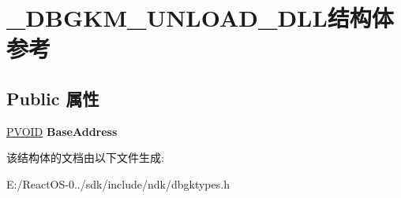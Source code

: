 \hypertarget{struct___d_b_g_k_m___u_n_l_o_a_d___d_l_l}{}\section{\+\_\+\+D\+B\+G\+K\+M\+\_\+\+U\+N\+L\+O\+A\+D\+\_\+\+D\+L\+L结构体 参考}
\label{struct___d_b_g_k_m___u_n_l_o_a_d___d_l_l}
\subsection*{Public 属性}
\begin{DoxyCompactItemize}
\item 
\mbox{\label{struct___d_b_g_k_m___u_n_l_o_a_d___d_l_l_a7d685fb3e4c06c0253adb057204347b2}} 
\hyperlink{interfacevoid}{P\+V\+O\+ID} {\bfseries Base\+Address}
\end{DoxyCompactItemize}


该结构体的文档由以下文件生成\+:\begin{DoxyCompactItemize}
\item 
E\+:/\+React\+O\+S-\/0../sdk/include/ndk/dbgktypes.\+h\end{DoxyCompactItemize}
